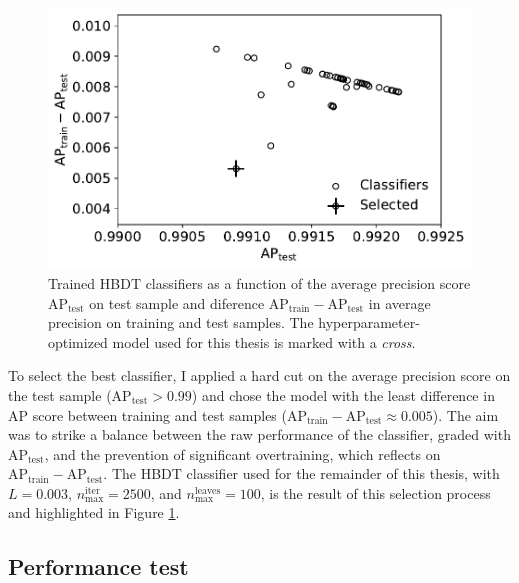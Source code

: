 \begin{figure}
	\centering
	\includegraphics[width=.6\textwidth]{graphics/04-event_selection/meantest_vs_diffscore.pdf}
	\caption{Trained HBDT classifiers as a function of the average precision score $\text{AP}_\text{test}$ on test sample and diference $\text{AP}_\text{train} - \text{AP}_\text{test}$ in average precision on training and test samples. The hyperparameter-optimized model used for this thesis is marked with a \textit{cross}.}
	\label{fig:4:meantest_vs_diffscore}
\end{figure}

To select the best classifier, I applied a hard cut on the average precision score on the test sample ($\text{AP}_\text{test} > 0.99$) and chose the model with the least difference in AP score between training and test samples ($\text{AP}_\text{train} - \text{AP}_\text{test} \approx 0.005$).
The aim was to strike a balance between the raw performance of the classifier, graded with $\text{AP}_\text{test}$, and the prevention of significant overtraining, which reflects on $\text{AP}_\text{train} - \text{AP}_\text{test}$.
The HBDT classifier used for the remainder of this thesis, with $L=0.003$, $n_\text{max}^\text{iter}=2500$, and $n_\text{max}^\text{leaves}=100$, is the result of this selection process and highlighted in Figure \ref{fig:4:meantest_vs_diffscore}.

\subsection{Performance test}

